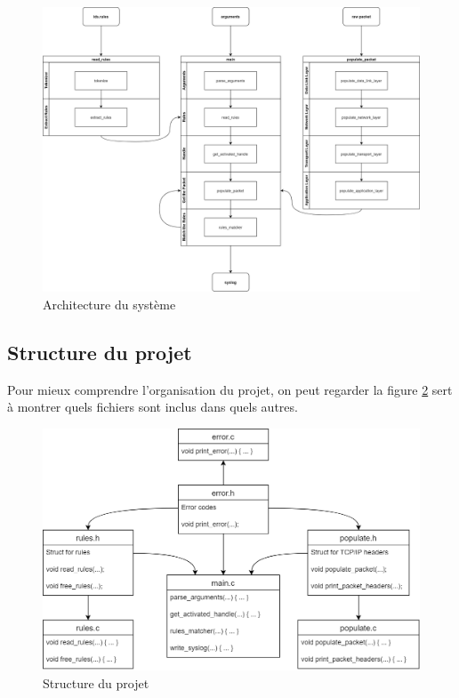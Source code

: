 \documentclass[a4paper]{article}
\begin{document}
\begin{figure}[H]
    \centering
    \includegraphics[width=0.99\linewidth]{../markdown-explanations/images/software-architecture-2.png}
    \caption{Architecture du système}
    \label{fig:archsys}
\end{figure}





\subsection{Structure du projet}



Pour mieux comprendre l'organisation du projet, on peut regarder la figure \ref{fig:structproj} sert à montrer quels fichiers sont inclus dans quels autres.

\begin{figure}[H]
    \centering
    \includegraphics[width=0.90\linewidth]{../markdown-explanations/images/project-structure.png}
    \caption{Structure du projet}
    \label{fig:structproj}
\end{figure}
\end{document}
